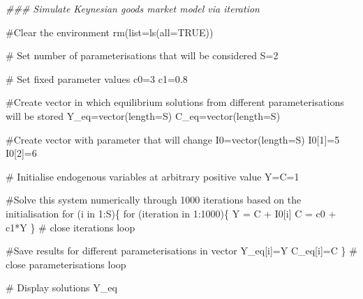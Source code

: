 \documentclass[
  letterpaper,
  DIV=11,
  numbers=noendperiod]{scrreprt}
\newenvironment{Shaded}{\begin{snugshade}}{\end{snugshade}}
\newcommand{\AttributeTok}[1]{\textcolor[rgb]{0.40,0.45,0.13}{#1}}
\newcommand{\CommentTok}[1]{\textcolor[rgb]{0.37,0.37,0.37}{#1}}
\newcommand{\ConstantTok}[1]{\textcolor[rgb]{0.56,0.35,0.01}{#1}}
\newcommand{\ControlFlowTok}[1]{\textcolor[rgb]{0.00,0.23,0.31}{#1}}
\newcommand{\DecValTok}[1]{\textcolor[rgb]{0.68,0.00,0.00}{#1}}
\newcommand{\DocumentationTok}[1]{\textcolor[rgb]{0.37,0.37,0.37}{\textit{#1}}}
\newcommand{\FloatTok}[1]{\textcolor[rgb]{0.68,0.00,0.00}{#1}}
\newcommand{\FunctionTok}[1]{\textcolor[rgb]{0.28,0.35,0.67}{#1}}
\newcommand{\NormalTok}[1]{\textcolor[rgb]{0.00,0.23,0.31}{#1}}
\newcommand{\OtherTok}[1]{\textcolor[rgb]{0.00,0.23,0.31}{#1}}
\newcommand{\SpecialCharTok}[1]{\textcolor[rgb]{0.37,0.37,0.37}{#1}}
\begin{document}
\begin{Shaded}
\begin{Highlighting}[]
\DocumentationTok{\#\#\# Simulate Keynesian goods market model via iteration}

\CommentTok{\#Clear the environment }
\FunctionTok{rm}\NormalTok{(}\AttributeTok{list=}\FunctionTok{ls}\NormalTok{(}\AttributeTok{all=}\ConstantTok{TRUE}\NormalTok{))}

\CommentTok{\# Set number of parameterisations that will be considered}
\NormalTok{S}\OtherTok{=}\DecValTok{2}

\CommentTok{\# Set fixed parameter values}
\NormalTok{c0}\OtherTok{=}\DecValTok{3}
\NormalTok{c1}\OtherTok{=}\FloatTok{0.8}

\CommentTok{\#Create vector in which equilibrium solutions from different parameterisations will be stored}
\NormalTok{Y\_eq}\OtherTok{=}\FunctionTok{vector}\NormalTok{(}\AttributeTok{length=}\NormalTok{S)}
\NormalTok{C\_eq}\OtherTok{=}\FunctionTok{vector}\NormalTok{(}\AttributeTok{length=}\NormalTok{S)}

\CommentTok{\#Create vector with parameter that will change }
\NormalTok{I0}\OtherTok{=}\FunctionTok{vector}\NormalTok{(}\AttributeTok{length=}\NormalTok{S)}
\NormalTok{I0[}\DecValTok{1}\NormalTok{]}\OtherTok{=}\DecValTok{5}
\NormalTok{I0[}\DecValTok{2}\NormalTok{]}\OtherTok{=}\DecValTok{6}

\CommentTok{\# Initialise endogenous variables at arbitrary positive value }
\NormalTok{Y}\OtherTok{=}\NormalTok{C}\OtherTok{=}\DecValTok{1}

\CommentTok{\#Solve this system numerically through 1000 iterations based on the initialisation}
\ControlFlowTok{for}\NormalTok{ (i }\ControlFlowTok{in} \DecValTok{1}\SpecialCharTok{:}\NormalTok{S)\{}
  \ControlFlowTok{for}\NormalTok{ (iteration }\ControlFlowTok{in} \DecValTok{1}\SpecialCharTok{:}\DecValTok{1000}\NormalTok{)\{}
\NormalTok{  Y }\OtherTok{=}\NormalTok{ C }\SpecialCharTok{+}\NormalTok{ I0[i]}
\NormalTok{  C }\OtherTok{=}\NormalTok{ c0 }\SpecialCharTok{+}\NormalTok{ c1}\SpecialCharTok{*}\NormalTok{Y}
\NormalTok{  \} }\CommentTok{\# close iterations loop}
  
\CommentTok{\#Save results for different parameterisations in vector}
\NormalTok{Y\_eq[i]}\OtherTok{=}\NormalTok{Y}
\NormalTok{C\_eq[i]}\OtherTok{=}\NormalTok{C}
\NormalTok{\} }\CommentTok{\# close parameterisations loop}

\CommentTok{\# Display solutions}
\NormalTok{Y\_eq}
\end{Highlighting}
\end{Shaded}
\end{document}
